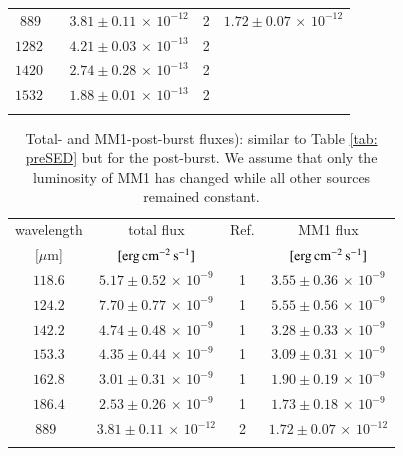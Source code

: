 \begin{appendix}
\begin{table}
\begin{threeparttable}[b]
\begin{tabular}{cccc}
$ 889~~~ $ & $ 3.81 \pm 0.11\,{\times}\,10^{-12}$  & 2 & $ 1.72 \pm 0.07\,{\times}\,10^{-12}$ \\ 
$ 1282~~~~ $ & $ 4.21 \pm 0.03\,{\times}\,10^{-13}$  & 2 & \\ 
$ 1420~~~~ $ & $ 2.74\pm 0.28\,{\times}\,10^{-13}$  & 2 & \\ 
$ 1532~~~~ $ & $ 1.88\pm 0.01\,{\times}\,10^{-13}$  & 2 & \\ 
\noalign{\smallskip}
\hline
\end{tabular}
\end{threeparttable}
\end{table}

\begin{table}
\begin{threeparttable}[b]
\caption[]{Total- and MM1-post-burst fluxes): similar to Table \ref{tab: preSED} but for the post-burst. We assume that only the luminosity of MM1 has changed while all other sources remained constant.} %
\label{tab: postSED}
\begin{tabular}{cccc}
\hline
\noalign{\smallskip}
wavelength & total flux & Ref.  & MM1 flux  \\
$[\mu$m] & $[{\rm erg \, cm^{-2} \, s^{-1}}]$ & & $[{\rm erg \, cm^{-2}\, s^{-1}}]$ \\
\noalign{\smallskip}
\hline
\noalign{\smallskip}
$ 118.6 $ & $ 5.17 \pm 0.52\,{\times}\,10^{-9}$  & 1& $ 3.55 \pm 0.36\,{\times}\,10^{-9}$ \\ 
$ 124.2 $& $ 7.70 \pm 0.77\,{\times}\,10^{-9}$  & 1  & $ 5.55 \pm 0.56\,{\times}\,10^{-9}$ \\ 
$ 142.2 $  & $ 4.74 \pm 0.48\,{\times}\,10^{-9}$  & 1 & $ 3.28 \pm 0.33\,{\times}\,10^{-9}$ \\ 
$ 153.3 $ & $ 4.35 \pm 0.44\,{\times}\,10^{-9}$  & 1 & $ 3.09 \pm 0.31\,{\times}\,10^{-9}$ \\ 
$ 162.8 $  & $ 3.01 \pm 0.31\,{\times}\,10^{-9}$  & 1& $ 1.90 \pm 0.19\,{\times}\,10^{-9}$ \\ 
$ 186.4 $& $ 2.53 \pm 0.26 \,{\times}\,10^{-9}$  & 1 & $ 1.73 \pm 0.18\,{\times}\,10^{-9}$ \\ 
$ 889~~ $ & $ 3.81 \pm 0.11\,{\times}\,10^{-12}$  & 2 & $ 1.72 \pm 0.07\,{\times}\,10^{-12}$ \\ 


\noalign{\smallskip}
\hline
\end{tabular}
\end{threeparttable}
\end{table}


\end{appendix}

